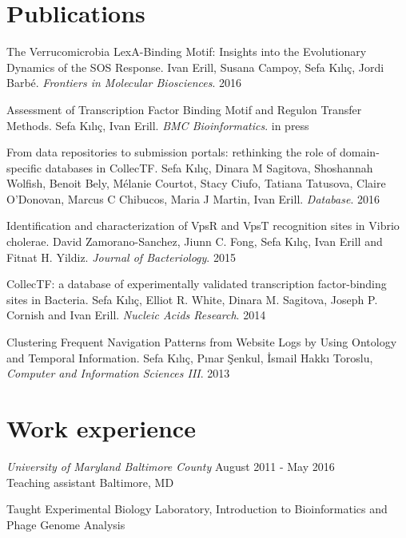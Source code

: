 {\section*{\textbf{Publications}}
\begin{myenumerate}
\item The Verrucomicrobia LexA-Binding Motif: Insights into the Evolutionary
  Dynamics of the SOS Response. Ivan Erill, Susana Campoy, Sefa Kılıç, Jordi
  Barbé. \textit{Frontiers in Molecular Biosciences}. 2016

\item Assessment of Transcription Factor Binding Motif and Regulon Transfer
  Methods. Sefa Kılıç, Ivan Erill. \textit{BMC Bioinformatics}. in press

\item From data repositories to submission portals: rethinking the role of
  domain-specific databases in CollecTF. Sefa Kılıç, Dinara M Sagitova,
  Shoshannah Wolfish, Benoit Bely, Mélanie Courtot, Stacy Ciufo, Tatiana
  Tatusova, Claire O’Donovan, Marcus C Chibucos, Maria J Martin, Ivan
  Erill. \textit{Database}. 2016

\item Identification and characterization of VpsR and VpsT recognition sites in
  Vibrio cholerae. David Zamorano-Sanchez, Jiunn C. Fong, Sefa Kılıç, Ivan
  Erill and Fitnat H. Yildiz. \textit{Journal of Bacteriology}. 2015

\item CollecTF: a database of experimentally validated transcription
  factor-binding sites in Bacteria. Sefa Kılıç, Elliot R. White, Dinara
  M. Sagitova, Joseph P. Cornish and Ivan Erill. \textit{Nucleic Acids
  Research}. 2014

\item Clustering Frequent Navigation Patterns from Website Logs by Using
  Ontology and Temporal Information. Sefa Kılıç, Pınar Şenkul, İsmail Hakkı
  Toroslu, \textit{Computer and Information Sciences III}. 2013

\end{myenumerate}


\section*{\textbf{Work experience}}

\textit{University of Maryland Baltimore County} \hfill{August 2011 - May 2016}\\
Teaching assistant \hfill{Baltimore, MD}
\begin{myitemize}
\item Taught Experimental Biology Laboratory, Introduction to Bioinformatics
  and Phage Genome Analysis
\end{myitemize}

}
